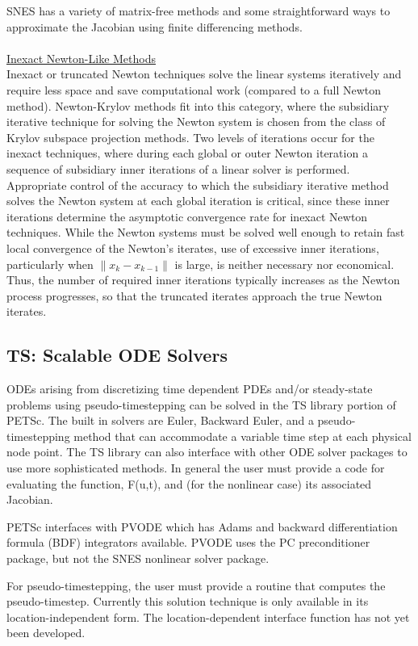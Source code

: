 \documentclass[12pt,twoside]{article}
\begin{document}
SNES has a variety of matrix-free methods and some straightforward ways to approximate the Jacobian using finite differencing methods. \\
\\
\underline{Inexact Newton-Like Methods} \\
Inexact or truncated Newton techniques solve the linear systems iteratively and require less space and save computational work (compared to a full Newton method). Newton-Krylov methods fit into this category, where the subsidiary iterative technique for solving the Newton system is chosen from the class of
Krylov subspace projection methods. Two levels of iterations occur for the inexact techniques, where during each global or outer Newton iteration a sequence of subsidiary inner iterations of a linear solver is performed. Appropriate control of the accuracy to which the subsidiary iterative method solves the Newton system at each global iteration is critical, since these inner iterations determine the asymptotic convergence rate for inexact Newton techniques. While the Newton systems must be solved well enough to retain fast local convergence of the Newton's iterates, use of excessive inner iterations, particularly when $\|x_{k} - x_{k-1}\|$ is large, is neither necessary nor economical. Thus, the number of required inner iterations typically increases as the Newton process progresses, so that the truncated iterates approach the true Newton iterates.

\subsection{TS: Scalable ODE Solvers}
ODEs arising from discretizing time dependent PDEs and/or steady-state problems using pseudo-timestepping can be solved in the TS library portion of PETSc. The built in solvers are Euler, Backward Euler, and a pseudo-timestepping method that can accommodate a variable time step at each physical node point. The TS library can also interface with other ODE solver packages to use more sophisticated methods. In general the user must provide a code for evaluating the function, F(u,t), and (for the nonlinear case) its associated Jacobian. 

PETSc interfaces with PVODE which has Adams and backward differentiation formula (BDF) integrators available. PVODE uses the PC preconditioner package, but not the SNES nonlinear solver package. 

For pseudo-timestepping, the user must provide a routine that computes the pseudo-timestep. Currently this solution technique is only available in its location-independent form. The location-dependent interface function has not yet been developed. 
\end{document}
